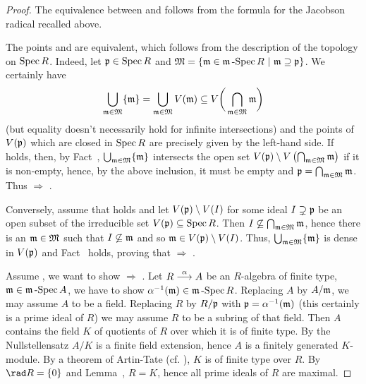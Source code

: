 \documentclass[a4paper,parskip=half,numbers=enddot, DIV=12]{scrreprt}
\begin{document}
\begin{proof}
    The equivalence between  and  follows from the formula for the Jacobson radical recalled above.
    
    The points  and  are equivalent, which follows from the description of the topology on $\operatorname{Spec} R$. Indeed, let $\mathfrak{p}\in\operatorname{Spec} R$ and $\mathfrak{M}=\left\{\mathfrak{m}\in\mathfrak{m}\operatorname{-Spec} R\ \middle|\  \mathfrak{m}\supseteq\mathfrak{p}\right\}$. We certainly have 
    \begin{align*}
    	\bigcup_{\mathfrak{m}\in\mathfrak{M}}\{\mathfrak{m}\}=\bigcup_{\mathfrak{m}\in\mathfrak{M}}V(\mathfrak{m})\subseteq V\bigg(\bigcap_{\mathfrak{m}\in\mathfrak{M}}\mathfrak{m}\bigg)
    \end{align*}
     (but equality doesn't necessarily hold for infinite intersections) and the points of $V(\mathfrak{p})$ which are closed in $\operatorname{Spec} R$ are precisely given by the left-hand side. If  holds, then, by Fact~, $\bigcup_{\mathfrak{m}\in\mathfrak{M}}\{\mathfrak{m}\}$ intersects the open set $V(\mathfrak{p})\setminus V\left(\bigcap_{\mathfrak{m}\in\mathfrak{M}}\mathfrak{m}\right)$ if it is non-empty, hence, by the above inclusion, it must be empty and $\mathfrak{p}=\bigcap_{\mathfrak{m}\in\mathfrak{M}}\mathfrak{m}$. Thus  $\Rightarrow$ .
     
     Conversely, assume that  holds and let $V(\mathfrak{p})\setminus V(I)$ for some ideal $I\supsetneq\mathfrak{p}$ be an open subset of the irreducible set $V(\mathfrak{p})\subseteq \operatorname{Spec} R$. Then $I\not\subseteq \bigcap_{\mathfrak{m}\in\mathfrak{M}}\mathfrak{m}$, hence there is an $\mathfrak{m}\in\mathfrak{M}$ such that $I\not\subseteq\mathfrak{m}$ and so $\mathfrak{m}\in V(\mathfrak{p})\setminus V(I)$. Thus, $\bigcup_{\mathfrak{m}\in\mathfrak{M}}\{\mathfrak{m}\}$ is dense in $V(\mathfrak{p})$ and Fact~ holds, proving that  $\Rightarrow$ .
    
    Assume , we want to show  $\Rightarrow$ . Let $R\morphism[\alpha]A$ be an $R$-algebra of finite type, $\mathfrak{m}\in \mathfrak{m}\operatorname{-Spec} A$, we have to show $\alpha^{-1}(\mathfrak{m}) \in \mathfrak{m}\operatorname{-Spec} R$. Replacing $A$ by $A/\mathfrak{m}$, we may assume $A$ to be a field. Replacing $R$ by $R/\mathfrak{p}$ with $\mathfrak{p} = \alpha^{-1}(\mathfrak{m})$ (this certainly is a prime ideal of $R$) we may assume $R$ to be a subring of that field. Then $A$ contains the field $K$ of quotients of $R$ over which it is of finite type. By the Nullstellensatz $A/K$ is a finite field extension, hence $A$ is a finitely generated $K$-module. By a theorem of Artin-Tate (cf. \cite[Proposition~1.4.2]{alg1}), $K$ is of finite type over $R$. By $\rad R = \{0\}$ and Lemma~, $R=K$, hence all prime ideals of $R$ are maximal. 
    

\end{proof}
\end{document}
